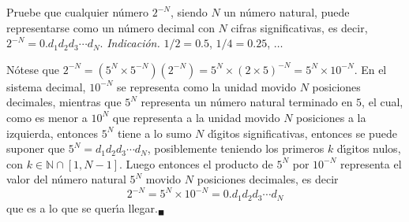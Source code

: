 \begin{enunciado}
 Pruebe que cualquier n\'umero $2^{-N}$, siendo $N$ un n\'umero natural, puede representarse como un n\'umero decimal con $N$ cifras significativas, es decir, $2^{-N} = 0.d_1d_2d_3\cdots d_N$. \textit{Indicaci\'on.} $1/2 = 0.5$, $1/4 = 0.25$, $\ldots$
\end{enunciado}

\begin{solucion}
 N\'otese que $2^{-N} = \left(  5^{N} \times 5^{-N} \right) \left( 2^{-N} \right) = 5^{N} \times \left( 2\times5 \right)^{-N} = 5^{N} \times 10^{-N}$. En el sistema decimal, $10^{-N}$ se representa como la unidad movido $N$ posiciones decimales, mientras que $5^N$ representa un n\'umero natural terminado en $5$, el cual, como es menor a $10^N$ que representa a la unidad movido $N$ posiciones a la izquierda, entonces $5^N$ tiene a lo sumo $N$ d\'{\i}gitos significativas, entonces se puede suponer que $5^N = d_1d_2d_3\cdots d_N$, posiblemente teniendo los primeros $k$ d\'{\i}gitos nulos, con $k\in \mathbb{N}\cap[1,N-1]$. Luego entonces el producto de $5^N$ por $10^{-N}$ representa el valor del n\'umero natural $5^N$ movido $N$ posiciones decimales, es decir
 \begin{equation*}
  2^{-N} = 5^N \times 10^{-N} = 0.d_1d_2d_3\cdots d_N
 \end{equation*}
 que es a lo que se quer\'{\i}a llegar.${}_{\blacksquare}$
\end{solucion}
